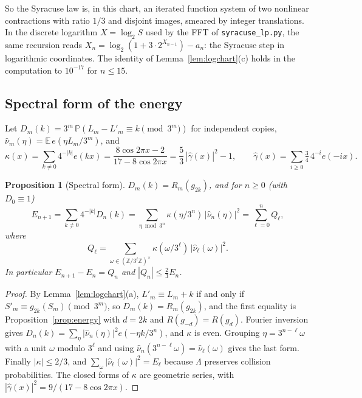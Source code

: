 \documentclass[11pt]{article}
\newtheorem{proposition}[theorem]{Proposition}
\theoremstyle{remark}
\newcommand{\Z}{\mathbb Z}
\newcommand{\E}{\mathbb E}
\newcommand{\Prob}{\mathbb P}
\begin{document}
So the Syracuse law is, in this chart, an iterated function system of two nonlinear contractions with ratio $1/3$ and disjoint images, smeared by integer translations. In the discrete logarithm $X=\log_2S$ used by the FFT of \texttt{syracuse\_lp.py}, the same recursion reads $X_n=\log_2(1+3\cdot2^{X_{n-1}})-a_n$: the Syracuse step in logarithmic coordinates. The identity of Lemma~\ref{lem:logchart}(c) holds in the computation to $10^{-17}$ for $n\le15$.

\subsection*{Spectral form of the energy}
Let $D_m(k)=3^m\,\Prob(L_m-L'_m\equiv k\pmod{3^m})$ for independent copies, $\widehat\nu_m(\eta)=\E\,e(\eta L_m/3^m)$, and
\[
 \kappa(x)=\sum_{k\ne0}4^{-|k|}e(kx)=\frac{8\cos2\pi x-2}{17-8\cos2\pi x}=\frac53\,|\widehat\gamma(x)|^2-1,\qquad \widehat\gamma(x)=\sum_{i\ge0}\tfrac34\,4^{-i}e(-ix).
\]

\begin{proposition}[Spectral form]\label{prop:spectral}
$D_m(k)=R_m(g_{2k})$, and for $n\ge0$ (with $D_0\equiv1$)
\[
 E_{n+1}=\sum_{k\ne0}4^{-|k|}D_n(k)=\sum_{\eta\bmod3^n}\kappa(\eta/3^n)\,|\widehat\nu_n(\eta)|^2=\sum_{\ell=0}^nQ_\ell,
\]
where
\[
 Q_\ell=\sum_{\omega\in(\Z/3^\ell\Z)^\times}\kappa(\omega/3^\ell)\,|\widehat\nu_\ell(\omega)|^2 .
\]
In particular $E_{n+1}-E_n=Q_n$ and $|Q_n|\le\frac23E_n$.
\end{proposition}

\begin{proof}
By Lemma~\ref{lem:logchart}(a), $L'_m\equiv L_m+k$ if and only if $S'_m\equiv g_{2k}(S_m)\pmod{3^m}$, so $D_m(k)=R_m(g_{2k})$, and the first equality is Proposition~\ref{prop:energy} with $d=2k$ and $R(g_{-d})=R(g_d)$. Fourier inversion gives $D_n(k)=\sum_\eta|\widehat\nu_n(\eta)|^2e(-\eta k/3^n)$, and $\kappa$ is even. Grouping $\eta=3^{n-\ell}\omega$ with a unit $\omega$ modulo $3^\ell$ and using $\widehat\nu_n(3^{n-\ell}\omega)=\widehat\nu_\ell(\omega)$ gives the last form. Finally $|\kappa|\le2/3$, and $\sum_\omega|\widehat\nu_\ell(\omega)|^2=E_\ell$ because $\Lambda$ preserves collision probabilities. The closed forms of $\kappa$ are geometric series, with $|\widehat\gamma(x)|^2=9/(17-8\cos2\pi x)$.
\end{proof}
\end{document}
